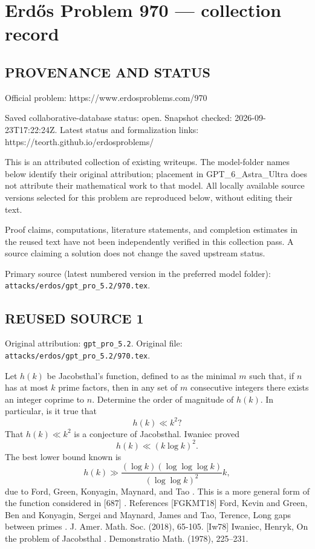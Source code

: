 \section*{Erd\H{o}s Problem 970 --- collection record}

\subsection*{PROVENANCE AND STATUS}
Official problem: https://www.erdosproblems.com/970

Saved collaborative-database status: open.
Snapshot checked: 2026-09-23T17:22:24Z.
Latest status and formalization links: https://teorth.github.io/erdosproblems/

This is an attributed collection of existing writeups. The model-folder names below identify their original attribution; placement in GPT\_6\_Astra\_Ultra does not attribute their mathematical work to that model. All locally available source versions selected for this problem are reproduced below, without editing their text.

Proof claims, computations, literature statements, and completion estimates in the reused text have not been independently verified in this collection pass. A source claiming a solution does not change the saved upstream status.

Primary source (latest numbered version in the preferred model folder): \texttt{attacks/erdos/gpt\_pro\_5.2/970.tex}.

\subsection*{REUSED SOURCE 1}
Original attribution: \texttt{gpt\_pro\_5.2}.
Original file: \texttt{attacks/erdos/gpt\_pro\_5.2/970.tex}.


Let $h(k)$ be Jacobsthal's function, defined to as the minimal $m$ such that, if $n$ has at most $k$ prime factors, then in any set of $m$ consecutive integers there exists an integer coprime to $n$. Determine the order of magnitude of $h(k)$. In particular, is it true that\[h(k) \ll k^2?\] That $h(k)\ll k^2$ is a conjecture of Jacobsthal. Iwaniec \cite{Iw78} proved\[h(k) \ll (k\log k)^2.\]The best lower bound known is\[h(k) \gg \frac{(\log k)(\log\log\log k)}{(\log\log k)^2}k,\]due to Ford, Green, Konyagin, Maynard, and Tao \cite{FGKMT18}. This is a more general form of the function considered in [687] . References [FGKMT18] Ford, Kevin and Green, Ben and Konyagin, Sergei and Maynard, James and Tao, Terence, Long gaps between primes . J. Amer. Math. Soc. (2018), 65-105. [Iw78] Iwaniec, Henryk, On the problem of {J}acobsthal . Demonstratio Math. (1978), 225--231.


